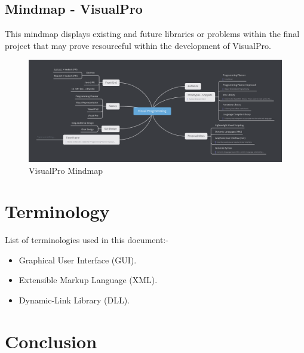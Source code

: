 \documentclass[conference]{IEEEtran}
\begin{document}
      \begin{landscape}
        \thispagestyle{fancylandscape}
        \subsection{Mindmap - VisualPro}
        This mindmap displays existing and future libraries or problems within the final project that may prove resourceful within the development of VisualPro.
        \begin{figure}[h]
          \includegraphics[height=.83\textheight, width=1.30\textwidth]{Figures/mindmap-vp.png}
          \caption{VisualPro Mindmap}
        \end{figure}
      \end{landscape}

    \section{Terminology}
      List of terminologies used in this document:-
      \begin{itemize}
        \item Graphical User Interface (GUI).
        \item Extensible Markup Language (XML).
        \item Dynamic-Link Library (DLL).
      \end{itemize}

    \section{Conclusion}
    
	\nocite{*}
	\renewcommand\refname{\section{Reference List}}
	\small{
    }
\end{document}
